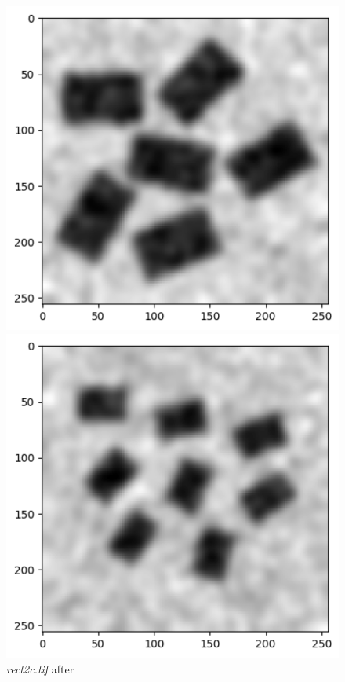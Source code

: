 \documentclass[runningheads]{llncs}
\begin{document}
\begin{figure}[h!]
\begin{minipage}[h]{0.47\linewidth}
\begin{center}
\includegraphics[width=1\linewidth]{Report/Result_Images/image_hc6.png} 
\caption{\emph{rect2c.tif} after}
\label{hc6-Gaussian and Kernel 5}
\end{center}
\end{minipage}
\vfill
\vspace{0.2 cm}
\begin{minipage}[h]{0.47\linewidth}
\begin{center}
\includegraphics[width=1\linewidth]{Report/Result_Images/image_hc7.png} 

\end{center}
\end{minipage}
\end{figure}
\end{document}
